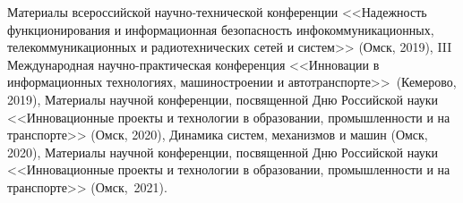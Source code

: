 Материалы всероссийской научно-технической конференции <<Надежность функционирования и информационная безопасность инфокоммуникационных, телекоммуникационных и радиотехнических сетей и систем>> (Омск, 2019),
III Международная научно-практическая конференция <<Инновации в информационных технологиях, машиностроении и автотранспорте>>~(Кемерово, 2019),
Материалы научной конференции, посвященной Дню Российской науки <<Инновационные проекты и технологии в образовании, промышленности и на транспорте>> (Омск, 2020),
Динамика систем, механизмов и машин (Омск, 2020),
Материалы научной конференции, посвященной Дню Российской науки <<Инновационные проекты и технологии в образовании, промышленности и на транспорте>> (Омск,~2021).

